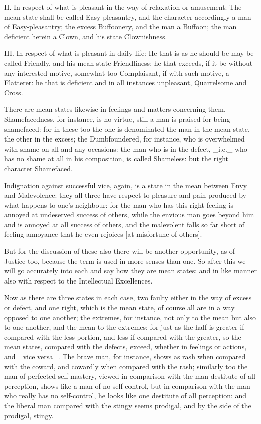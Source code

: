 II. In respect of what is pleasant in the way of relaxation or
amusement: The mean state shall be called Easy-pleasantry, and the
character accordingly a man of Easy-pleasantry; the excess Buffoonery,
and the man a Buffoon; the man deficient herein a Clown, and his state
Clownishness.

III. In respect of what is pleasant in daily life: He that is as he
should be may be called Friendly, and his mean state Friendliness: he
that exceeds, if it be without any interested motive, somewhat too
Complaisant, if with such motive, a Flatterer: he that is deficient and
in all instances unpleasant, Quarrelsome and Cross.

There are mean states likewise in feelings and matters concerning them.
Shamefacedness, for instance, is no virtue, still a man is praised for
being shamefaced: for in these too the one is denominated the man in the
mean state, the other in the excess; the Dumbfoundered, for instance,
who is overwhelmed with shame on all and any occasions: the man who is
in the defect, _i.e._ who has no shame at all in his composition, is
called Shameless: but the right character Shamefaced.

Indignation against successful vice, again, is a state in the mean
between Envy and Malevolence: they all three have respect to pleasure
and pain produced by what happens to one's neighbour: for the man who
has this right feeling is annoyed at undeserved success of others, while
the envious man goes beyond him and is annoyed at all success of others,
and the malevolent falls so far short of feeling annoyance that he even
rejoices [at misfortune of others].

But for the discussion of these also there will be another opportunity,
as of Justice too, because the term is used in more senses than one. So
after this we will go accurately into each and say how they are mean
states: and in like manner also with respect to the Intellectual
Excellences.

Now as there are three states in each case, two faulty either in the way
of excess or defect, and one right, which is the mean state, of course
all are in a way opposed to one another; the extremes, for instance, not
only to the mean but also to one another, and the mean to the extremes:
for just as the half is greater if compared with the less portion, and
less if compared with the greater, so the mean states, compared with the
defects, exceed, whether in feelings or actions, and _vice versa_. The
brave man, for instance, shows as rash when compared with the coward,
and cowardly when compared with the rash; similarly too the man of
perfected self-mastery, viewed in comparison with the man destitute of
all perception, shows like a man of no self-control, but in comparison
with the man who really has no self-control, he looks like one destitute
of all perception: and the liberal man compared with the stingy seems
prodigal, and by the side of the prodigal, stingy.

